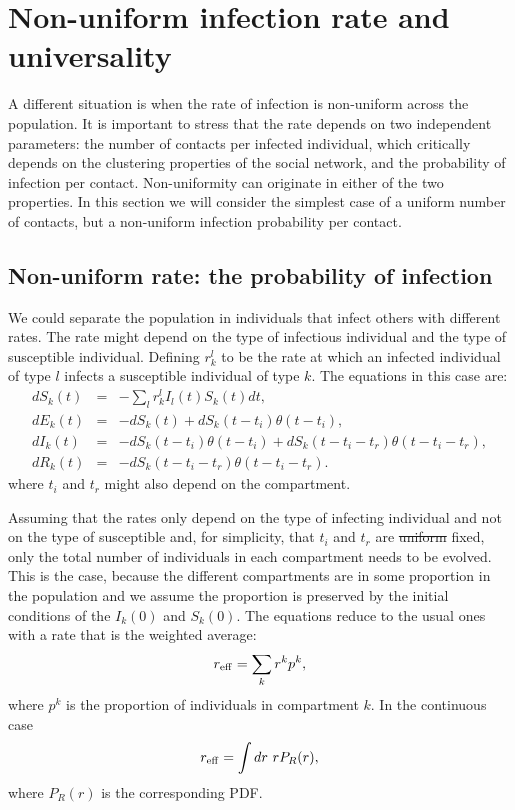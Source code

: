 \documentclass[10pt,letterpaper]{article}
\newcommand{\mychange}[2]{\textcolor[rgb]{0.75,0,0}{\st{#1} {#2}}}
\begin{document}
\section*{Non-uniform infection rate and universality }
\label{sec:r}

A different situation is when the rate of infection is non-uniform across the population. It is important to stress that the rate depends on two independent parameters: the number of contacts per infected individual, which critically depends on the clustering properties of the social network,  and the probability of infection per contact. Non-uniformity can originate in either of the two properties. In this section we will consider the simplest case of a uniform number of contacts, but a non-uniform infection probability per contact.

\subsection*{Non-uniform rate: the probability of infection}
\label{sec:prob}

We could separate the population in individuals that infect others with different rates. The rate might depend on the type of infectious individual and the type of susceptible individual. Defining $r^{l}_{k}$ to be the rate at which an infected individual of type $l$ infects a susceptible individual of type $k$. The equations in this case are:
\begin{eqnarray}
d S_k(t) &=& - \sum_l r^l_{k}  I_l(t) S_k(t) dt, \nonumber\\
d E_k(t) &=& -d S_k(t) + d S_k(t-t_i) \theta(t-t_i) ,\nonumber\\
d I_k(t) &=& -d S_k(t-t_i) \theta(t-t_i)+ d S_k(t-t_i-t_r) \theta(t-t_i-t_r),\nonumber\\
d R_k(t) &=& - d S_k(t - t_i - t_r) \theta(t-t_i-t_r).\nonumber
\end{eqnarray}
where $t_i$ and $t_r$ might also depend on the compartment.

Assuming that the rates only depend on the type of infecting individual and not on the type of susceptible and, for simplicity, that $t_i$ and $t_r$ are \mychange{uniform}{fixed}, only the total number of individuals in each compartment needs to be evolved. This is the case, because the different compartments are in some proportion in the population and we assume the proportion is preserved by
 the initial conditions of the $I_k(0)$ and $S_k(0)$. The equations reduce to the usual ones with a rate that is the weighted average:
 \begin{eqnarray}
 r_{\rm eff} = \sum_k r^k p^k,
 \end{eqnarray}
 where $p^k$ is the proportion of individuals in compartment $k$. In the continuous case
 \begin{eqnarray}
 r_{\rm eff} = \int dr ~r P_R(r),
 \end{eqnarray}
 where $P_R(r)$ is the corresponding PDF. 
\end{document}
